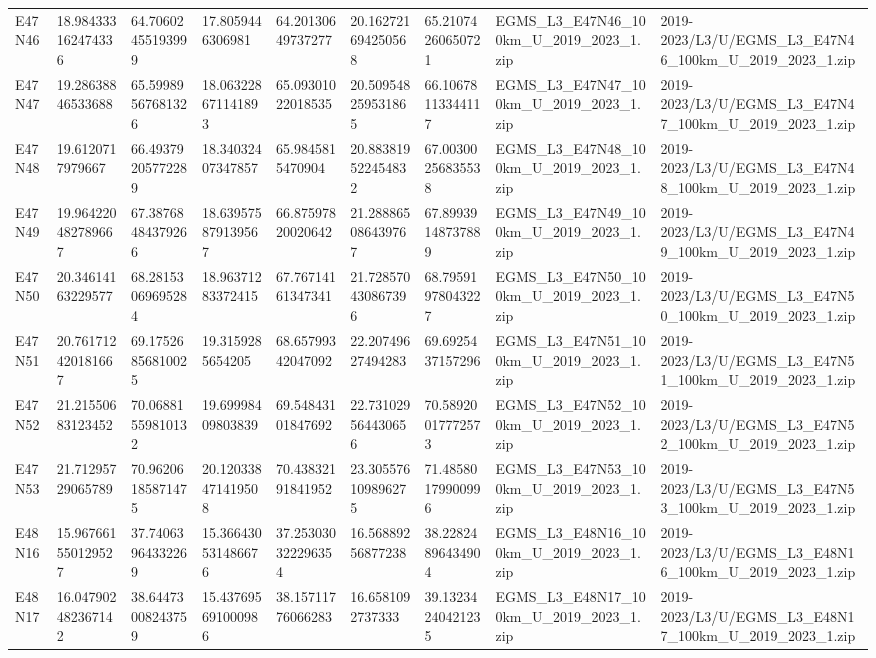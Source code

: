 \begin{landscape}
\begin{longtable}{lllllllll}
E47N46 & 18.984333162474336 & 64.70602455193999 & 17.8059446306981 & 64.20130649737277 & 20.162721694250568 & 65.21074260650721 & EGMS\_L3\_E47N46\_100km\_U\_2019\_2023\_1.zip & 2019-2023/L3/U/EGMS\_L3\_E47N46\_100km\_U\_2019\_2023\_1.zip \\
E47N47 & 19.28638846533688 & 65.59989567681326 & 18.063228671141893 & 65.09301022018535 & 20.509548259531865 & 66.10678113344117 & EGMS\_L3\_E47N47\_100km\_U\_2019\_2023\_1.zip & 2019-2023/L3/U/EGMS\_L3\_E47N47\_100km\_U\_2019\_2023\_1.zip \\
E47N48 & 19.6120717979667 & 66.49379205772289 & 18.34032407347857 & 65.9845815470904 & 20.883819522454832 & 67.00300256835538 & EGMS\_L3\_E47N48\_100km\_U\_2019\_2023\_1.zip & 2019-2023/L3/U/EGMS\_L3\_E47N48\_100km\_U\_2019\_2023\_1.zip \\
E47N49 & 19.964220482789667 & 67.38768484379266 & 18.639575879139567 & 66.87597820020642 & 21.288865086439767 & 67.89939148737889 & EGMS\_L3\_E47N49\_100km\_U\_2019\_2023\_1.zip & 2019-2023/L3/U/EGMS\_L3\_E47N49\_100km\_U\_2019\_2023\_1.zip \\
E47N50 & 20.34614163229577 & 68.28153069695284 & 18.96371283372415 & 67.76714161347341 & 21.728570430867396 & 68.79591978043227 & EGMS\_L3\_E47N50\_100km\_U\_2019\_2023\_1.zip & 2019-2023/L3/U/EGMS\_L3\_E47N50\_100km\_U\_2019\_2023\_1.zip \\
E47N51 & 20.761712420181667 & 69.17526856810025 & 19.3159285654205 & 68.65799342047092 & 22.20749627494283 & 69.6925437157296 & EGMS\_L3\_E47N51\_100km\_U\_2019\_2023\_1.zip & 2019-2023/L3/U/EGMS\_L3\_E47N51\_100km\_U\_2019\_2023\_1.zip \\
E47N52 & 21.21550683123452 & 70.06881559810132 & 19.69998409803839 & 69.54843101847692 & 22.731029564430656 & 70.58920017772573 & EGMS\_L3\_E47N52\_100km\_U\_2019\_2023\_1.zip & 2019-2023/L3/U/EGMS\_L3\_E47N52\_100km\_U\_2019\_2023\_1.zip \\
E47N53 & 21.71295729065789 & 70.96206185871475 & 20.120338471419508 & 70.43832191841952 & 23.305576109896275 & 71.48580179900996 & EGMS\_L3\_E47N53\_100km\_U\_2019\_2023\_1.zip & 2019-2023/L3/U/EGMS\_L3\_E47N53\_100km\_U\_2019\_2023\_1.zip \\
E48N16 & 15.967661550129527 & 37.74063964332269 & 15.366430531486676 & 37.253030322296354 & 16.56889256877238 & 38.22824896434904 & EGMS\_L3\_E48N16\_100km\_U\_2019\_2023\_1.zip & 2019-2023/L3/U/EGMS\_L3\_E48N16\_100km\_U\_2019\_2023\_1.zip \\
E48N17 & 16.047902482367142 & 38.64473008243759 & 15.437695691000986 & 38.15711776066283 & 16.6581092737333 & 39.13234240421235 & EGMS\_L3\_E48N17\_100km\_U\_2019\_2023\_1.zip & 2019-2023/L3/U/EGMS\_L3\_E48N17\_100km\_U\_2019\_2023\_1.zip \\

\end{longtable}
\end{landscape}
